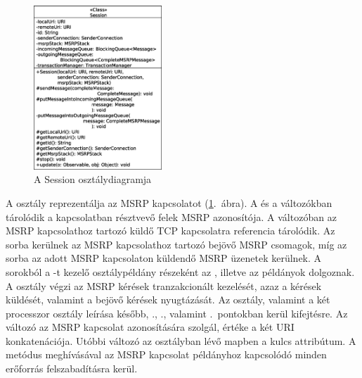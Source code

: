 \begin{figure}
  \vspace{-15pt}
  \begin{center}
    \includegraphics[width=0.43\textwidth]{img/class_diagrams/Session.eps}
  \end{center}
  \vspace{-15pt}
  \captionsetup{font=scriptsize}
  \caption{A Session osztálydiagramja}
   \label{fig:class_session}
  \vspace{-10pt}
\end{figure}
A  osztály reprezentálja az MSRP kapcsolatot (\ref{fig:class_session}.~ábra). A  és a  változókban tárolódik a kapcsolatban résztvevő felek MSRP azonosítója. A  változóban az MSRP kapcsolathoz tartozó küldő TCP kapcsolatra referencia tárolódik. Az  sorba kerülnek az MSRP kapcsolathoz tartozó bejövő MSRP csomagok, míg az  sorba az adott MSRP kapcsolaton küldendő MSRP üzenetek kerülnek. A sorokból a -t kezelő  osztálypéldány részeként az , illetve az  példányok dolgoznak. A  osztály végzi az MSRP kérések tranzakcionált kezelését, azaz a kérések küldését, valamint a bejövő kérések nyugtázását. Az osztály, valamint a két processzor osztály leírása később, ., ., valamint .~pontokban kerül kifejtésre. Az  változó az MSRP kapcsolat azonosítására szolgál, értéke a két URI konkatenációja. Utóbbi változó az  osztályban lévő  mapben a kulcs attribútum. A  metódus meghívásával az MSRP kapcsolat példányhoz kapcsolódó minden erőforrás felszabadításra kerül. 

